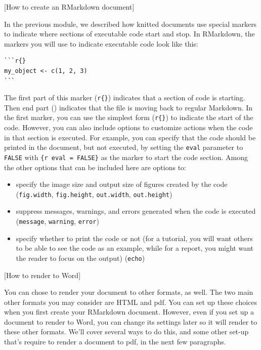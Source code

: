 \documentclass[]{tufte-book}
\providecommand{\tightlist}{%
  \setlength{\itemsep}{0pt}\setlength{\parskip}{0pt}}
\begin{document}
{[}How to create an RMarkdown document{]}

In the previous module, we described how knitted documents use special markers
to indicate where sections of executable code start and stop. In RMarkdown,
the markers you will use to indicate executable code look like this:

\begin{verbatim}
```r{}
my_object <- c(1, 2, 3)
```
\end{verbatim}

The first part of this marker (\texttt{\textasciigrave{}\textasciigrave{}\textasciigrave{}r\{\}}) indicates that a section of
code is starting. Then end part (\texttt{\textasciigrave{}\textasciigrave{}\textasciigrave{}}) indicates that the file is
moving back to regular Markdown. In the first marker, you can use the simplest
form (\texttt{\textasciigrave{}\textasciigrave{}\textasciigrave{}r\{\}}) to indicate the start of the code. However, you can also
include options to customize actions when the code in that section is executed.
For example, you can specify that the code should be printed in the document,
but not executed, by setting the \texttt{eval} parameter to \texttt{FALSE} with \texttt{\textasciigrave{}\textasciigrave{}\textasciigrave{}\{r\ eval\ =\ FALSE\}} as the marker to start the code section. Among the other
options that can be included here are options to:

\begin{itemize}
\tightlist
\item
  specify the image size and output size of figures created by the code
  (\texttt{fig.width}, \texttt{fig.height}, \texttt{out.width}, \texttt{out.height})
\item
  suppress messages, warnings, and errors generated when the code is
  executed (\texttt{message}, \texttt{warning}, \texttt{error})
\item
  specify whether to print the code or not (for a tutorial, you will want
  others to be able to see the code as an example, while for a report, you
  might want the reader to focus on the output) (\texttt{echo})
\end{itemize}

{[}How to render to Word{]}

You can chose to render your document to other formats, as well. The two
main other formats you may consider are HTML and pdf. You can set up these
choices when you first create your RMarkdown document. However, even if you
set up a document to render to Word, you can change its settings later so
it will render to these other formats. We'll cover several ways to do this,
and some other set-up that's require to render a document to pdf, in the
next few paragraphs.
\end{document}
